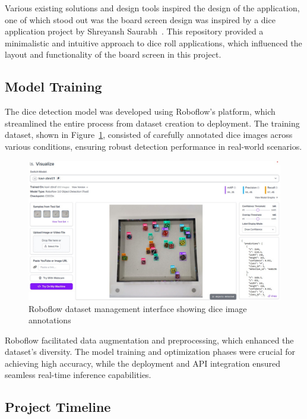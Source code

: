 Various existing solutions and design tools inspired the design of the application, one of which stood out was the board screen design was inspired by a dice application project by Shreyansh Saurabh~\cite{bib:binaryshrey}. This repository provided a minimalistic and intuitive approach to dice roll applications, which influenced the layout and functionality of the board screen in this project.

\subsection{Model Training}

The dice detection model was developed using Roboflow's platform, which streamlined the entire process from dataset creation to deployment. The training dataset, shown in Figure~\ref{fig:roboflow_dataset}, consisted of carefully annotated dice images across various conditions, ensuring robust detection performance in real-world scenarios.

\begin{figure}[ht!]
    \centering
    \includegraphics[width=\textwidth]{img/roboflow_dataset.jpg}
    \caption{Roboflow dataset management interface showing dice image annotations}
    \label{fig:roboflow_dataset}
\end{figure}

Roboflow facilitated data augmentation and preprocessing, which enhanced the dataset's diversity. The model training and optimization phases were crucial for achieving high accuracy, while the deployment and API integration ensured seamless real-time inference capabilities.

\subsection{Project Timeline}


